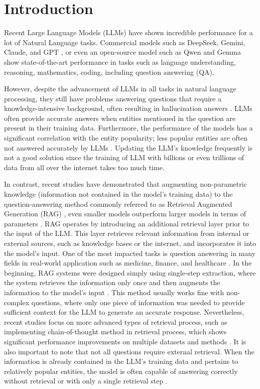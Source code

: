 \documentclass[times]{iapress}
\begin{document}
\section{Introduction}\label{sec:introduction}
Recent Large Language Models (LLMs) have shown incredible performance for a lot of Natural Language tasks. Commercial models such as DeepSeek, Gemini, Claude, and GPT \cite{deepseek} \cite{gemini} \cite{claude} \cite{gpt}, or even an open-source model such as Qwen and Gemma \cite{qwen} \cite{gemma} show state-of-the-art performance in tasks such as language understanding, reasoning, mathematics, coding, including question answering (QA).

However, despite the advancement of LLMs in all tasks in natural language processing, they still have problems answering questions that require a knowledge-intensive background, often resulting in hallucination answers \cite{hallu_llm}. LLMs often provide accurate answers when entities mentioned in the question are present in their training data. Furthermore, the performance of the models has a significant correlation with the entity popularity; less popular entities are often not answered accurately by LLMs \cite{trust_llm}. Updating the LLM's knowledge frequently is not a good solution since the training of LLM with billions or even trillions of data from all over the internet takes too much time.

In contrast, recent studies have demonstrated that augmenting non-parametric knowledge (information not contained in the model's training data) to the question-answering method commonly referred to as Retrieval Augmented Generation (RAG) \cite{first_rag}, even smaller models outperform larger models in terms of parameters \cite{atlas_rag}. RAG operates by introducing an additional retrieval layer prior to the input of the LLM. This layer retrieves relevant information from internal or external sources, such as knowledge bases or the internet, and incorporates it into the model’s input. One of the most impacted tasks is question answering in many fields in real-world application such as medicine, finance, and healthcare \cite{medicine_rag} \cite{financial_rag} \cite{medical_rag}. In the beginning, RAG systems were designed simply using single-step extraction, where the system retrieves the information only once and then augments the information to the model's input \cite{internet_augmented} \cite{singlestep_second}. This method usually works fine with non-complex questions, where only one piece of information was needed to provide sufficient context for the LLM to generate an accurate response. Nevertheless, recent studies focus on more advanced types of retrieval process, such as implementing chain-of-thought method in retrieval process, which shows significant performance improvements on multiple datasets and methods \cite{ircot}.  It is also important to note that not all questions require external retrieval.  When the information is already contained in the LLM's training data and pertains to relatively popular entities, the model is often capable of answering correctly without retrieval or with only a single retrieval step \cite{adaptive_rag}.
\end{document}
